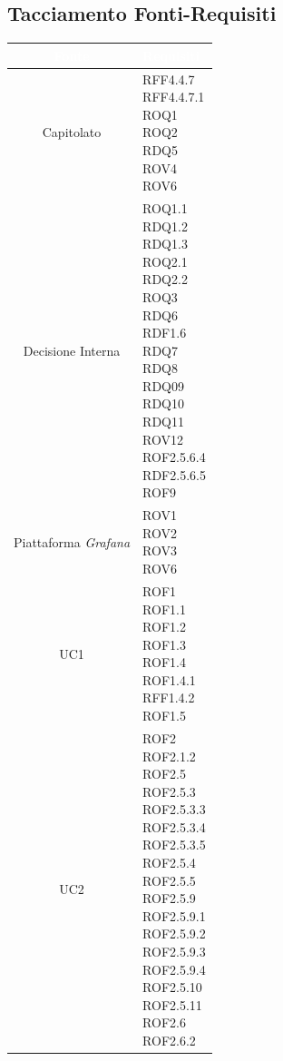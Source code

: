 \subsection{Tacciamento Fonti-Requisiti}\label{Tracciamento}
\begin{center}
\begin{longtable}[c]{|c|m{}|}
\hline
\rowcolor{bluelogo}\textbf{\textcolor{white}{Fonte}} & \textbf{\textcolor{white}{Requisiti}}\\
\hline \hline
\endhead
Capitolato & \makecell{RFF4.4.7\\RFF4.4.7.1\\ROQ1\\ROQ2\\RDQ5\\ROV4\\ROV6}\\
\hline
\rowcolor{grigio}Decisione Interna & \makecell{ROQ1.1\\RDQ1.2 \\ RDQ1.3\\ROQ2.1\\RDQ2.2\\ROQ3\\RDQ6\\RDF1.6\\RDQ7\\RDQ8 \\ RDQ09 \\ RDQ10 \\ RDQ11\\ROV12\\ROF2.5.6.4\\RDF2.5.6.5\\ROF9}\\
\hline
Piattaforma \textit{Grafana} & \makecell{ROV1\\ROV2\\ROV3\\ROV6}\\
\hline
\rowcolor{grigio}UC1 & \makecell{ROF1\\ROF1.1\\ROF1.2\\ROF1.3\\ROF1.4\\ROF1.4.1\\RFF1.4.2\\ROF1.5}\\
\hline
UC2 & \makecell{ROF2\\ROF2.1.2\\ROF2.5\\ROF2.5.3\\ROF2.5.3.3\\ROF2.5.3.4\\ROF2.5.3.5\\ROF2.5.4\\ROF2.5.5\\ROF2.5.9\\ROF2.5.9.1\\ROF2.5.9.2\\ROF2.5.9.3\\ROF2.5.9.4\\ROF2.5.10\\ ROF2.5.11\\ROF2.6\\ROF2.6.2}\\

\end{longtable}
\end{center}
